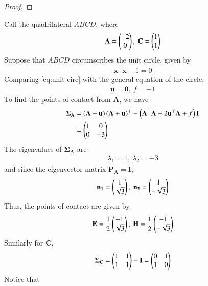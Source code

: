 \documentclass[journal,12pt,twocolumn]{IEEEtran}
\renewcommand{\vec}[1]{\boldsymbol{\mathbf{#1}}}
\begin{document}
\begin{enumerate}
\begin{proof}
    \end{proof}
    Call the quadrilateral $ABCD$, where
    \begin{align}
        \vec{A} = \myvec{-2\\0},\ \vec{C} = \myvec{1\\1}
        \label{eq:a-c-def}
    \end{align}
    Suppose that $ABCD$ circumscribes the unit circle, given by
    \begin{align}
        \vec{x}^\top\vec{x} - 1 = 0
        \label{eq:unit-circ}
    \end{align}
    Comparing \eqref{eq:unit-circ} with the general equation of the circle,
    \begin{align}
        \vec{u} = \vec{0},\ f = -1
        \label{eq:u-f-val}
    \end{align}
    To find the points of contact from $\vec{A}$, we have
    \begin{align}
        \vec{\Sigma_A} &= \brak{\vec{A}+\vec{u}}\brak{\vec{A}+\vec{u}}^\top - \brak{\vec{A}^\top\vec{A}+2\vec{u}^\top\vec{A} + f}\vec{I} \\
                     &= \myvec{1&0\\0&-3}
                     \label{eq:sigma}
    \end{align}
    The eigenvalues of $\vec{\Sigma_A}$ are
    \begin{align}
        \lambda_1 = 1,\ \lambda_2 = -3
        \label{eq:lambda}
    \end{align}
    and since the eigenvector matrix $\vec{P_A} = \vec{I}$,
    \begin{align}
        \vec{n_1} = \myvec{1\\\sqrt{3}},\ \vec{n_2} = \myvec{1\\-\sqrt{3}}
        \label{eq:n-sigma}
    \end{align}
    Thus, the points of contact are given by
    \begin{align}
        \vec{E} = \frac{1}{2}\myvec{-1\\\sqrt{3}},\ \vec{H} = \frac{1}{2}\myvec{-1\\-\sqrt{3}}
        \label{eq:poc-eh}
    \end{align}
    Similarly for $\vec{C}$,
    \begin{align}
        \vec{\Sigma_C} = \myvec{1&1\\1&1} - \vec{I} = \myvec{0&1\\1&0}
    \end{align}
    Notice that
    \begin{align}

\end{align}
\end{enumerate}
\end{document}

